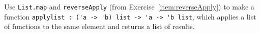 Use \lstinline{List.map} and \lstinline{reverseApply} (from Exercise~\ref{item:reverseApply}) to make a function \lstinline{applylist : ('a -> 'b) list -> 'a -> 'b list}, which applies a list of functions to the same element and returns a list of results.
